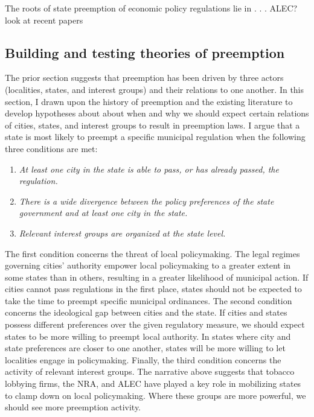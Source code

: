 \documentclass[12pt]{article}
\begin{document}
The roots of state preemption of economic policy regulations lie in . . . 
ALEC? look at recent papers 


\subsection*{Building and testing theories of preemption}
The prior section suggests that preemption has been driven by three actors (localities, states, and interest groups) and their relations to one another. In this section, I drawn upon the history of preemption and the existing literature to develop hypotheses about about when and why we should expect certain relations of cities, states, and interest groups to result in preemption laws. I argue that a state is most likely to preempt a specific municipal regulation when the following three conditions are met:

\singlespacing
\begin{enumerate}
	\item \textit{At least one city in the state is able to pass, or has already passed, the regulation.}
	\item \textit{There is a wide divergence between the policy preferences of the state government and at least one city in the state.}
	\item \textit{Relevant interest groups are organized at the state level.}
\end{enumerate}

The first condition concerns the threat of local policymaking. The legal regimes governing cities' authority empower local policymaking to a greater extent in some states than in others, resulting in a greater likelihood of municipal action. If cities cannot pass regulations in the first place, states should not be expected to take the time to preempt specific municipal ordinances. The second condition concerns the ideological gap between cities and the state. If cities and states possess different preferences over the given regulatory measure, we should expect states to be more willing to preempt local authority. In states where city and state preferences are closer to one another, states will be more willing to let localities engage in policymaking. Finally, the third condition concerns the activity of relevant interest groups. The narrative above suggests that tobacco lobbying firms, the NRA, and ALEC have played a key role in mobilizing states to clamp down on local policymaking. Where these groups are more powerful, we should see more preemption activity. 
\end{document}
